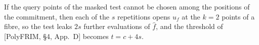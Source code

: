 \begin{remark}\label{rem:avss-leak}
If the query points of the masked test cannot be chosen among the positions of the commitment,
then each of the $s$ repetitions opens $u_f$ at the $k=2$ points of a fibre, so the test leaks
$2s$ further evaluations of $\hat f$, and the threshold of {[PolyFRIM, \S4, App.~D]} becomes
$t=c+4s$.
\end{remark}
